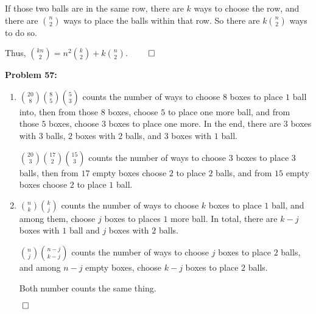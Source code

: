 \documentclass[12pt]{article}
\newcommand{\prob}[1]{\textbf{Problem #1:}}
\begin{document}
        If those two balls are in the same row, there are $k$ ways to choose the row, and there are $\binom{n}{2}$ ways to place the balls within that row. So there are $k \binom{n}{2}$ ways to do so. 

        Thus, $\binom{kn}{2} = n^2 \binom{k}{2} + k \binom{n}{2}$. $\qed$

\prob{57} 

\begin{enumerate}[label=(\alph*)]
    \item $\binom{20}{8} \binom{8}{5} \binom{5}{3}$ counts the number of ways to choose $8$ boxes to place $1$ ball into, then from those $8$ boxes, choose $5$ to place one more ball, and from those $5$ boxes, choose $3$ boxes to place one more. In the end, there are $3$ boxes with $3$ balls, $2$ boxes with $2$ balls, and $3$ boxes with $1$ ball.
        
    $\binom{20}{3} \binom{17}{2} \binom{15}{3}$ counts the number of ways to choose $3$ boxes to place $3$ balls, then from $17$ empty boxes choose $2$ to place $2$ balls, and from $15$ empty boxes choose $2$ to place $1$ ball.
    \item $\binom{n}{k} \binom{k}{j}$ counts the number of ways to choose $k$ boxes to place $1$ ball, and among them, choose $j$ boxes to places $1$ more ball. In total, there are $k-j$ boxes with $1$ ball and $j$ boxes with $2$ balls. 
        
    $\binom{n}{j} \binom{n-j}{k-j}$ counts the number of ways to choose $j$ boxes to place $2$ balls, and among $n-j$ empty boxes, choose $k-j$ boxes to place $2$ balls. 
    
    Both number counts the same thing.
\end{enumerate} $\qed$
\end{document}
